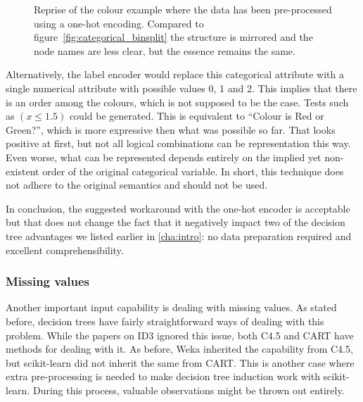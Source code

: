 \begin{figure}[htp]
\begin{center}
\end{center}
\caption{Reprise of the colour example where the data has been pre-processed using a one-hot encoding. Compared to figure~\ref{fig:categorical_binsplit} the structure is mirrored and the node names are less clear, but the essence remains the same.}%
\label{fig:colour_onehot}
\end{figure}

Alternatively, the label encoder would replace this categorical attribute with a single numerical attribute with possible values 0, 1 and 2. This implies that there is an order among the colours, which is not supposed to be the case. Tests such as $(x \leqslant 1.5)$ could be generated. This is equivalent to ``Colour is Red or Green?'', which is more expressive then what was possible so far. That looks positive at first, but not all logical combinations can be representation this way. Even worse, what can be represented depends entirely on the implied yet non-existent order of the original categorical variable. In short, this technique does not adhere to the original semantics and should not be used.

In conclusion, the suggested workaround with the one-hot encoder is acceptable but that does not change the fact that it negatively impact two of the decision tree advantages we listed earlier in \autoref{cha:intro}: no data preparation required and excellent comprehensibility.

\subsubsection{Missing values}
Another important input capability is dealing with missing values. As stated before, decision trees have fairly straightforward ways of dealing with this problem. While the papers on ID3 ignored this issue, both C4.5 and CART have methods for dealing with it. As before, Weka inherited the capability from C4.5, but scikit-learn did not inherit the same from CART. This is another case where extra pre-processing is needed to make decision tree induction work with scikit-learn. During this process, valuable observations might be thrown out entirely.

